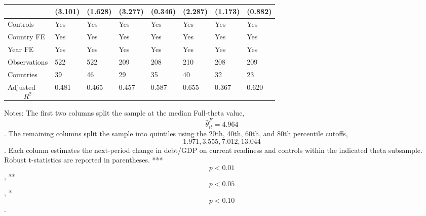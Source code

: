 \begin{table}[H]
\begin{threeparttable}
\begin{tabularx}{\textwidth}{lYYYYYYY}
  & (3.101) & (1.628) & (3.277) & (0.346) & (2.287) & (1.173) & (0.882) \\
\midrule
Controls & Yes & Yes & Yes & Yes & Yes & Yes & Yes \\
Country FE & Yes & Yes & Yes & Yes & Yes & Yes & Yes \\
Year FE & Yes & Yes & Yes & Yes & Yes & Yes & Yes \\
Observations & 522 & 522 & 209 & 208 & 210 & 208 & 209 \\
Countries & 39 & 46 & 29 & 35 & 40 & 32 & 23 \\
Adjusted $$R^2$$ & 0.481 & 0.465 & 0.457 & 0.587 & 0.655 & 0.367 & 0.620 \\
\bottomrule
\end{tabularx}
\begin{tablenotes}[flushleft]\footnotesize
\item Notes: The first two columns split the sample at the median Full-theta value, $$\widehat{\theta}^{F}_{it}=4.964$$. The remaining columns split the sample into quintiles using the 20th, 40th, 60th, and 80th percentile cutoffs, $$1.971, 3.555, 7.012, 13.044$$. Each column estimates the next-period change in debt/GDP on current readiness and controls within the indicated theta subsample. Robust t-statistics are reported in parentheses. *** $$p<0.01$$, ** $$p<0.05$$, * $$p<0.10$$.
\end{tablenotes}
\end{threeparttable}
\end{table}
